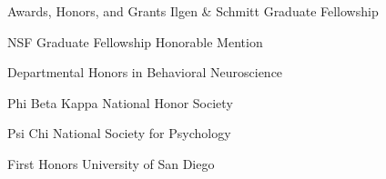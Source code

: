 
\begin{rubric}{Awards, Honors, and Grants}
\entry*[October 2018]
	Ilgen \& Schmitt Graduate Fellowship
	
\entry*[April 2018]
	NSF Graduate Fellowship Honorable Mention
	
\entry*[May 2016]
	Departmental Honors in Behavioral Neuroscience
	
\entry*[February 2016]
	Phi Beta Kappa National Honor Society
	
\entry*[April 2015]
	Psi Chi National Society for Psychology
	
\entry*[2012 - 2016]
	First Honors University of San Diego
	
\end{rubric}
